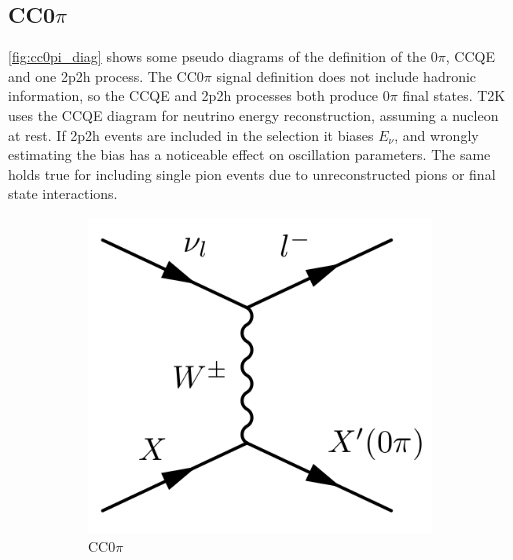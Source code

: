 \subsection{CC0$\pi$}
\autoref{fig:cc0pi_diag} shows some pseudo diagrams of the definition of the 0$\pi$, CCQE and one 2p2h process. The CC0$\pi$ signal definition does not include hadronic information, so the CCQE and 2p2h processes both produce 0$\pi$ final states. T2K uses the CCQE diagram for neutrino energy reconstruction, assuming a nucleon at rest. If 2p2h events are included in the selection it biases $E_\nu$, and wrongly estimating the bias has a noticeable effect on oscillation parameters. The same holds true for including single pion events due to unreconstructed pions or final state interactions.
\begin{figure}[h]
	\centering
	\begin{subfigure}[t]{0.32\textwidth}
		\includegraphics[width=\textwidth, trim={0mm 0mm 0mm 0mm}, clip,page=1]{figures/niwg/diagrams/CC0pi}
		\caption{CC0$\pi$}
	\end{subfigure}
	\begin{subfigure}[t]{0.32\textwidth}

\end{subfigure}
\end{figure}
